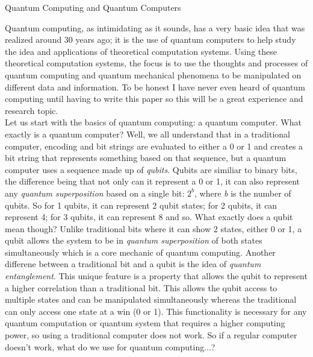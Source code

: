 \documentclass[11pt]{article}
\begin{document}
\begin{center}

Quantum Computing and Quantum Computers

\end{center}

\indent Quantum computing, as intimidating as it sounds, has a very basic idea that was realized around 30 years ago; it is the use of quantum computers to help study the idea and applications of theoretical computation systems. Using these theoretical computation systems, the focus is to use the thoughts and processes of quantum computing and quantum mechanical phenomena to be manipulated on different data and information. To be honest I have never even heard of quantum computing until having to write this paper so this will be a great experience and research topic.\\
\indent Let us start with the basics of quantum computing: a quantum computer. What exactly is a quantum computer? Well, we all understand that in a traditional computer, encoding and bit strings are evaluated to either a 0 or 1 and creates a bit string that represents something based on that sequence, but a quantum computer uses a sequence made up of \emph{qubits}. Qubits are similiar to binary bits, the difference being that not only can it represent a 0 or 1, it can also represent any \emph{quantum superposition} based on a single bit: $2^{b}$, where \emph{b} is the number of qubits. So for 1 qubits, it can represent 2 qubit states; for 2 qubits, it can represent 4; for 3 qubits, it can represent 8 and so. What exactly does a qubit mean though? Unlike traditional bits where it can show 2 states, either 0 or 1, a qubit allows the system to be in \emph{quantum superposition} of both states simultaneously which is a core mechanic of quantum computing. Another differene between a traditional bit and a qubit is the idea of \emph{quantum entanglement}. This unique feature is a property that allows the qubit to represent a higher correlation than a traditional bit. This allows the qubit access to multiple states and can be manipulated simultaneously whereas the traditional can only access one state at a win (0 or 1). This functionality is necessary for any quantum computation or quantum system that requires a higher computing power, so using a traditional computer does not work. So if a regular computer doesn't work, what do we use for quantum computing...?\\
\end{document}
